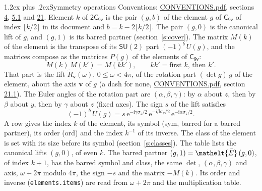 \documentclass[10pt,a4paper]{article}
\makeatletter
\renewcommand\section{\@startsection{section}{1}{\z@}{-3ex plus -1ex minus -.2ex}%
  {1.2ex plus .2ex}{\normalfont\large\sffamily\bfseries\color{parttitle}}}
\numberwithin{equation}{section}
\newcommand{\eltfont}[1]{{\let\sigma\eltsigma\mathelt{#1}}}
\newcommand{\grp}[1]{\mathsf{#1}}
\newcommand{\elt}[1]{\eltfont{#1}}
\newcommand{\vv}{\mathbf{v}}
\newcommand{\iunit}{\mathrm{i}}
\newcommand{\expe}{\mathrm{e}}
\newcommand{\barred}[1]{\bar{#1}}
\newcommand{\lift}[1]{\tilde{#1}}
\newcommand{\pauli}[1]{\sigma_{#1}}
\makeatother
\begin{document}
\section{Symmetry operations}\label{s:elements}
Conventions: \href{../../CONVENTIONS.pdf}{CONVENTIONS.pdf}, sections \href{../../../rotation/CONVENTIONS.pdf\#conv.4}{4}, \href{../../../rotation/CONVENTIONS.pdf\#conv.5.1}{5.1} and \href{../../CONVENTIONS.pdf\#conv.21}{21}.
\leavevmode\label{n:index.element}\label{n:element.g}Element $k$ of $\grp{2C_{9v}}$ is the pair $(g, b)$ of the element $g$ of \href{../../../rotation/data/pdf/C9v.pdf}{$\grp{C_{9v}}$} of index $\lfloor k/2\rfloor$ in its document and $b = k - 2\lfloor k/2\rfloor$. The pair $(g, 0)$ is the canonical lift of $g$, and $(g, 1)$ is its barred partner (section~\ref{s:cover}). \label{n:matrix.element.pin}\label{n:matrix.element}The matrix $M(k)$ of the element is the transpose of its $\grp{SU(2)}$ part $(-1)^{b}\,U(g)$, and the matrices compose as the matrices $P(g)$ of the elements of $\grp{C_{9v}}$:
\begin{equation}\label{e:mprod}M(k)\,M(k') = M(kk'),\qquad kk' = \text{first } k\text{, then } k'.\end{equation}
\leavevmode\label{n:angle.omega}\label{n:vector.axis}\label{n:vector.pole}That part is the lift $\lift{R}_{\vv}(\omega)$, $0 \le \omega < 4\pi$, of the rotation part $(\det g)\,g$ of the element, about the axis $\vv$ of $g$ (a dash for none, \href{../../CONVENTIONS.pdf}{CONVENTIONS.pdf}, section \href{../../CONVENTIONS.pdf\#conv.21.1}{21.1}). \label{n:angle.euler.alpha}\label{n:angle.euler.beta}\label{n:angle.euler.gamma}\label{n:vector.coordinates}The Euler angles of the rotation part are $(\alpha,\beta,\gamma)$: by $\alpha$ about $z$, then by $\beta$ about $y$, then by $\gamma$ about $z$ (fixed axes). \label{n:local.euler.sign}The sign $s$ of the lift satisfies
\begin{equation}\label{e:euler}(-1)^{b}\,U(g) = s\,\expe^{-\iunit\gamma\pauli{z}/2}\,\expe^{-\iunit\beta\pauli{y}/2}\,\expe^{-\iunit\alpha\pauli{z}/2}.\end{equation}
\leavevmode\label{n:index.element.inverse}\label{n:head.sym}\label{n:head.ord}A row gives the index $k$ of the element, its symbol (sym, barred for a barred partner), its order (ord) and the index $k^{-1}$ of its inverse. \label{n:head.class}The class of the element is set with its size before its symbol (section~\ref{s:classes}).
The table lists the canonical lifts $(g, 0)$, of even $k$. The barred partner $(g, 1) = \elt{\barred{E}}\,(g, 0)$, of index $k + 1$, has the barred symbol and class, the same $\det$, $(\alpha,\beta,\gamma)$ and axis, $\omega + 2\pi$ modulo $4\pi$, the sign $-s$ and the matrix $-M(k)$. Its order and inverse (\texttt{elements.items}) are read from $\omega + 2\pi$ and the multiplication table.
\end{document}
